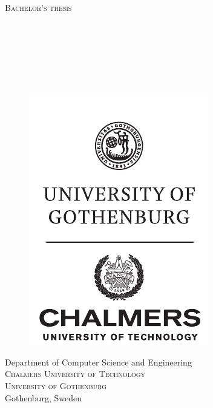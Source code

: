 \newpage
\restoregeometry
\thispagestyle{empty}
\mbox{}


\newpage
\thispagestyle{empty}
\begin{center}
	\textsc{\large Bachelor's thesis \the\year}\\[4cm]		%
	\textbf{\Large \multiLineTitle{0.2cm}} \\[1cm]
	{\large \oneLineSubtitle}\\[1cm]
	{\large \MARTIN}\\[1ex]
	{\large \FELIX}\\[1ex]
	{\large \HANNES}\\[1ex]
	{\large \MARCUS}\\[1ex]
	{\large \JAKOB}
	
	\vfill	
	\begin{figure}[H]
    	\centering
    	\includegraphics[width=0.25\pdfpagewidth]{modules/frontmatter/ChGULogoHog.pdf}
	\end{figure}	\vspace{5mm}	
	
	Department of Computer Science and Engineering\\
	\textsc{Chalmers University of Technology} \\
	\textsc{University of Gothenburg} \\
	Gothenburg, Sweden \the\year \\
\end{center}

